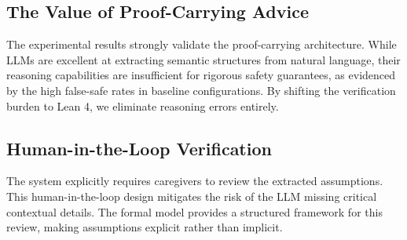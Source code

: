 \subsection{The Value of Proof-Carrying Advice}
The experimental results strongly validate the proof-carrying architecture. While LLMs are excellent at extracting semantic structures from natural language, their reasoning capabilities are insufficient for rigorous safety guarantees, as evidenced by the high false-safe rates in baseline configurations. By shifting the verification burden to Lean 4, we eliminate reasoning errors entirely.

\subsection{Human-in-the-Loop Verification}
The system explicitly requires caregivers to review the extracted assumptions. This human-in-the-loop design mitigates the risk of the LLM missing critical contextual details. The formal model provides a structured framework for this review, making assumptions explicit rather than implicit.
